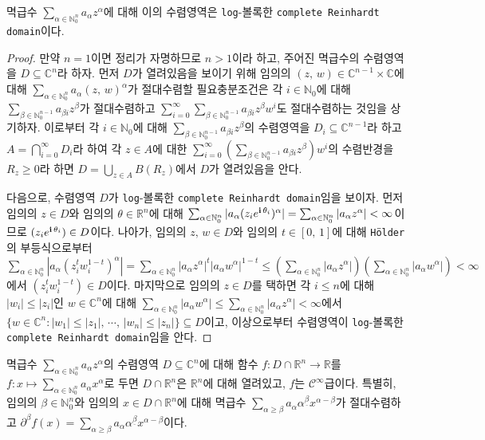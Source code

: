 \begin{theorem}
    멱급수 $\sum_{\alpha\in\mathbb{N}_0^n}a_\alpha z^\alpha$에 대해 이의 수렴영역은 \texttt{log}-볼록한 \texttt{complete Reinhardt domain}이다.
\end{theorem}

\begin{proof}
    만약 $n=1$이면 정리가 자명하므로 $n>1$이라 하고, 주어진 멱급수의 수렴영역을 $D\subseteq\mathbb{C}^n$라 하자. 먼저 $D$가 열려있음을 보이기 위해 임의의 $(z,\,w)\in\mathbb{C}^{n-1}\times\mathbb{C}$에 대해 $\sum_{\alpha\in\mathbb{N}_0^n}a_\alpha(z,\,w)^\alpha$가 절대수렴할 필요충분조건은 각 $i\in\mathbb{N}_0$에 대해 $\sum_{\beta\in\mathbb{N}_0^{n-1}}a_{\beta i}z^\beta$가 절대수렴하고 $\sum_{i=0}^\infty\sum_{\beta\in\mathbb{N}_0^{n-1}}a_{\beta i}z^\beta w^i$도 절대수렴하는 것임을 상기하자. 이로부터 각 $i\in\mathbb{N}_0$에 대해 $\sum_{\beta\in\mathbb{N}_0^{n-1}}a_{\beta i}z^\beta$의 수렴영역을 $D_i\subseteq\mathbb{C}^{n-1}$라 하고 $A=\bigcap_{i=0}^\infty D_i$라 하여 각 $z\in A$에 대한 $\sum_{i=0}^\infty(\sum_{\beta\in\mathbb{N}_0^{n-1}}a_{\beta i}z^\beta)w^i$의 수렴반경을 $R_z\geq0$라 하면 $D=\bigcup_{z\in A}B(R_z)$에서 $D$가 열려있음을 안다.

    다음으로, 수렴영역 $D$가 \texttt{log}-볼록한 \texttt{complete Reinhardt domain}임을 보이자. 먼저 임의의 $z\in D$와 임의의 $\theta\in\mathbb{R}^n$에 대해 $\sum_{\alpha\in\mathbb{N}_0^n}|a_\alpha(z_ie^{\mathbf{i}\,\theta_i})^\alpha|=\sum_{\alpha\in\mathbb{N}_0^n}|a_\alpha z^\alpha|<\infty$이므로 $(z_ie^{\mathbf{i}\,\theta_i})\in D$이다. 나아가, 임의의 $z,\,w\in D$와 임의의 $t\in[0,\,1]$에 대해 \texttt{H\"older}의 부등식으로부터 $\sum_{\alpha\in\mathbb{N}_0^n}|a_\alpha(z_i^tw_i^{1-t})^\alpha|=\sum_{\alpha\in\mathbb{N}_0^n}|a_\alpha z^\alpha|^t|a_\alpha w^\alpha|^{1-t}\leq(\sum_{\alpha\in\mathbb{N}_0^n}|a_\alpha z^\alpha|)(\sum_{\alpha\in\mathbb{N}_0^n}|a_\alpha w^\alpha|)<\infty$에서 $(z_i^tw_i^{1-t})\in D$이다. 마지막으로 임의의 $z\in D$를 택하면 각 $i\leq n$에 대해 $|w_i|\leq|z_i|$인 $w\in\mathbb{C}^n$에 대해 $\sum_{\alpha\in\mathbb{N}_0^n}|a_\alpha w^\alpha|\leq\sum_{\alpha\in\mathbb{N}_0^n}|a_\alpha z^\alpha|<\infty$에서 $\{w\in\mathbb{C}^n:|w_1|\leq|z_1|,\,\cdots,\,|w_n|\leq|z_n|\}\subseteq D$이고, 이상으로부터 수렴영역이 \texttt{log}-볼록한 \texttt{complete Reinhardt domain}임을 안다.
\end{proof}

\begin{theorem}
    멱급수 $\sum_{\alpha\in\mathbb{N}_0^n}a_\alpha z^\alpha$의 수렴영역 $D\subseteq\mathbb{C}^n$에 대해 함수 $f:D\cap\mathbb{R}^n\to\mathbb{R}$를 $f:x\mapsto\sum_{\alpha\in\mathbb{N}_0^n}a_\alpha x^\alpha$로 두면 $D\cap\mathbb{R}^n$은 $\mathbb{R}^n$에 대해 열려있고, $f$는 $\mathcal{C}^\infty$급이다. 특별히, 임의의 $\beta\in\mathbb{N}_0^n$와 임의의 $x\in D\cap\mathbb{R}^n$에 대해 멱급수 $\sum_{\alpha\geq\beta}a_\alpha\alpha^{\underline{\beta}}x^{\alpha-\beta}$가 절대수렴하고 $\partial^\beta f(x)=\sum_{\alpha\geq\beta}a_\alpha\alpha^{\underline{\beta}}x^{\alpha-\beta}$이다.
\end{theorem}

